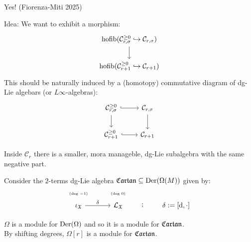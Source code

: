 \documentclass[beamer,10pt]{standalone}
\begin{document}
\begin{frame}
	Yes! (Fiorenza-Miti 2025)
	\vfill

	\begin{block}{Idea:}
		We want to exhibit a morphism:
		\begin{displaymath}
			\begin{tikzcd}[ampersand replacement=\&]
				\hofib(\mathcal{C}_{r,\sigma}^{\geq 0} \hookrightarrow \mathcal{C}_{r,\sigma}) \ar[d]
				\\
				\hofib(\mathcal{C}_{r+1}^{\geq 0} \hookrightarrow \mathcal{C}_{r+1})
			\end{tikzcd}
		\end{displaymath}
		This should be naturally induced by a (homotopy) commutative diagram of dg-Lie algebars (or $L\infty$-algebras):
		\begin{displaymath}
			\begin{tikzcd}[ampersand replacement=\&]
				\mathcal{C}_{r,\sigma}^{\geq 0} \ar[r,hook] \ar[d ]
				\& \mathcal{C}_{r,\sigma} \ar[d, ]
				\\
				\mathcal{C}_{r+1}^{\geq 0} \ar[r,hook] \& \mathcal{C}_{r+1} 
			\end{tikzcd}
		\end{displaymath}
	\end{block}
\end{frame}

\begin{frame}
  Inside $\mathcal{C}_r$ there is a smaller, mora manageble, dg-Lie subalgebra with the same negative part.
  \vfill

  Consider the $2$-terms dg-Lie algebra $\mathfrak{Cartan} \subseteq \mathrm{Der}(\Omega(M))$ given by:
  \begin{displaymath}
	\begin{tikzcd}[ampersand replacement=\&,row sep = small]
		\text{\tiny (deg $-1$)} \& \text{\tiny (deg $0$)}\&[2em]
		\\[-.7em]
		\iota_{\X} \ar[r,"\delta"] \& \Lie_{\X} \ar[r,phantom,";"] \& \delta:= [\d, \cdot]
	\end{tikzcd}
  \end{displaymath}
  \vfill

  $\Omega$ is a module for $\mathrm{Der}(\Omega)$ and so it is a module for $\mathfrak{Cartan}$.
  \\
  By shifting degrees, $\Omega[r]$ is a module for $\mathfrak{Cartan}$.
\end{frame}
\end{document}

